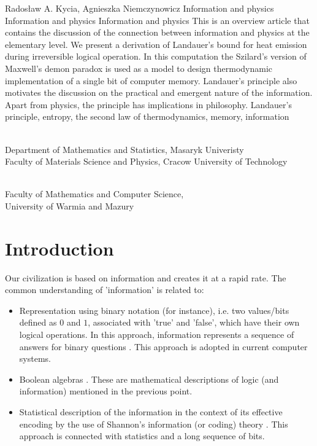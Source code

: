 \begin{artengenv2auth}{Rados\l aw A. Kycia, Agnieszka Niemczynowicz}
	{Information and physics}
	{Information and physics}
	{Information and physics}
	{}
	{This is an overview article that contains the discussion of the connection between information and physics at the elementary level. We present a derivation of Landauer's bound for heat emission during irreversible logical operation. In this computation the Szilard's version of Maxwell's demon paradox is used as a model to design thermodynamic implementation of a single bit of computer memory. Landauer's principle also motivates the discussion on the practical and emergent nature of the information. Apart from physics, the principle has implications in philosophy. }
	{Landauer's principle, entropy, the second law of thermodynamics, memory, information}
	{%
		{\flushright{}\\\subsubsectit\small{Department of Mathematics and Statistics, Masaryk Univeristy\\
		Faculty of Materials Science and Physics, Cracow University of Technology}\par}%
		{\flushright{}\\\subsubsectit\small{Faculty of Mathematics and Computer Science,\\
		University of Warmia and Mazury}\par}%
	}




\section{Introduction}
\lettrine[loversize=0.13,lines=2,lraise=-0.03,nindent=0em,findent=0.2pt]%
{O}{}ur civilization is based on information and creates it at a rapid rate. The common understanding of 'information' is related to:
\begin{itemize}
 \item {Representation using binary notation (for instance), i.e. two values/bits defined as $0$ and $1$, associated with 'true' and 'false', which have their own logical operations. In this approach, information represents a sequence of answers for binary questions \parencite{InformationEntropy}. This approach is adopted in current computer systems.}
 \item {Boolean algebras \parencite{InformationEntropy}. These are mathematical descriptions of logic (and information) mentioned in the previous point.}
 \item {Statistical description of the information in the context of its effective encoding by the use of Shannon's information (or coding) theory \parencite{InformationEntropy}. This approach is connected with statistics and a long sequence of bits.}
\end{itemize}


\end{artengenv2auth}

